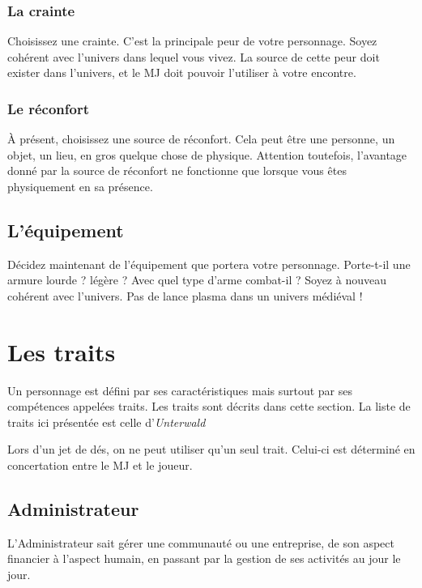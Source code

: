 \documentclass[a4paper,10pt,twoside,twocolumn,openany,bg=print,justified]{dndbook}
\begin{document}
\subsection*{La crainte}

Choisissez une crainte. C'est la principale peur de votre personnage. Soyez cohérent avec l'univers dans lequel vous vivez. La source de cette peur doit exister dans l'univers, et le MJ doit pouvoir l'utiliser à votre encontre.

\subsection*{Le réconfort}

À présent, choisissez une source de réconfort. Cela peut être une personne, un objet, un lieu, en gros quelque chose de physique. Attention toutefois, l'avantage donné par la source de réconfort ne fonctionne que lorsque vous êtes physiquement en sa présence.

\section{L'équipement}

Décidez maintenant de l'équipement que portera votre personnage. Porte-t-il une armure lourde ? légère ? Avec quel type d'arme combat-il ? Soyez à nouveau cohérent avec l'univers. Pas de lance plasma dans un univers médiéval !

\newpage

\chapter{Les traits}

Un personnage est défini par ses caractéristiques mais surtout par ses compétences appelées traits. Les traits sont décrits dans cette section. La liste de traits ici présentée est celle d'\emph{Unterwald}

Lors d'un jet de dés, on ne peut utiliser qu'un seul trait. Celui-ci est déterminé en concertation entre le MJ et le joueur.

\section*{Administrateur}

L'Administrateur sait gérer une communauté ou une entreprise, de son aspect financier à l'aspect humain, en passant par la gestion de ses activités au jour le jour.
\end{document}
